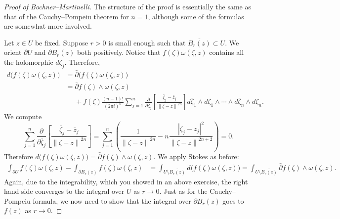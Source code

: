 \documentclass[12pt,openany]{book}
\newcommand{\abs}[1]{\left\lvert {#1} \right\rvert}
\newcommand{\norm}[1]{\left\lVert {#1} \right\rVert}
\theoremstyle{plain}
\theoremstyle{remark}
\theoremstyle{definition}
\theoremstyle{exercise}
\theoremstyle{example}
\begin{document}
\begin{proof}[Proof of Bochner--Martinelli]
The structure of the proof is essentially the same as that of
the Cauchy--Pompeiu theorem for $n=1$, although some of the formulas are somewhat
more involved.

Let $z \in U$ be fixed.  Suppose $r > 0$ is small enough such that
$\overline{B_r(z)} \subset U$.  We orient $\partial U$ and $\partial B_r(z)$
both positively.  Notice that 
$f(\zeta) \omega(\zeta,z)$ contains all the holomorphic $d\zeta_j$.
Therefore,
\begin{equation*}
\begin{split}
d \bigl( f(\zeta) \omega(\zeta,z) \bigr)
& =
\bar{\partial} \bigl( f(\zeta) \omega(\zeta,z) \bigr)
\\
& = 
\bar{\partial} f(\zeta) \wedge \omega(\zeta,z)
\\
& \phantom{=} +
f(\zeta)
\frac{(n-1)!}{{(2\pi i)}^n}
\sum_{j=1}^n
\frac{\partial}{\partial \bar{\zeta}_j} \left[
\frac{\bar{\zeta}_j-\bar{z}_j}{\norm{\zeta-z}^{2n}}
\right]
d\bar{\zeta}_1 \wedge d\zeta_1 \wedge
\cdots \wedge
d\bar{\zeta}_n \wedge d\zeta_n .
\end{split}
\end{equation*}
We compute
\begin{equation*}
\sum_{j=1}^n
\frac{\partial}{\partial \bar{\zeta}_j}
\left[
\frac{\bar{\zeta}_j-\bar{z}_j}{\norm{\zeta-z}^{2n}}
\right]
=
\sum_{j=1}^n
\left(
\frac{1}{\norm{\zeta-z}^{2n}}
-n
\frac{\abs{\zeta_j-z_j}^2}{\norm{\zeta-z}^{2n+2}}
\right)
= 0 .
\end{equation*}
Therefore 
$d \bigl( f(\zeta) \omega(\zeta,z) \bigr) = \bar{\partial} f(\zeta) \wedge
\omega(\zeta,z)$.
We apply Stokes as before:
\begin{equation*}
\begin{split}
\int_{\partial U}
f(\zeta) \omega(\zeta,z)
-
\int_{\partial B_r(z)}
f(\zeta) \omega(\zeta,z)
& =
\int_{U \setminus \overline{B_r(z)}}
d \bigl( f(\zeta) \omega(\zeta,z) \bigr)
=
\int_{U \setminus \overline{B_r(z)}}
\bar{\partial} f(\zeta) \wedge \omega(\zeta,z) .
\end{split}
\end{equation*}
Again, due to the integrability, which you showed in an above exercise,
the right hand side converges to the integral over $U$ as $r \to 0$.
Just as for the Cauchy--Pompeiu formula, we now need to show that the integral
over $\partial B_r(z)$ goes to $f(z)$ as $r \to 0$.


\end{proof}
\end{document}
